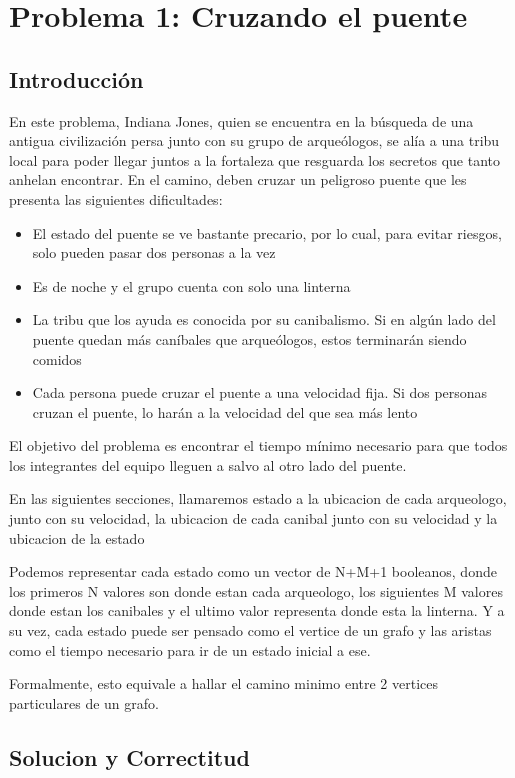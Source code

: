 \section{Problema 1: Cruzando el puente}

\subsection{Introducción}
	En este problema, Indiana Jones, quien se encuentra en la búsqueda de una antigua civilización persa junto con su grupo de arqueólogos, se alía a una tribu local para poder llegar juntos a la fortaleza que resguarda los secretos que tanto anhelan encontrar. En el camino, deben cruzar un peligroso puente que les presenta las siguientes dificultades:
	\begin{itemize}
	\item El estado del puente se ve bastante precario, por lo cual, para evitar riesgos, solo pueden pasar dos personas a la vez
	\item Es de noche y el grupo cuenta con solo una linterna
	\item La tribu que los ayuda es conocida por su canibalismo. Si en algún lado del puente quedan más caníbales que arqueólogos, estos terminarán siendo comidos
	\item Cada persona puede cruzar el puente a una velocidad fija. Si dos personas cruzan el puente, lo harán a la velocidad del que sea más lento
	\end{itemize}
	El objetivo del problema es encontrar el tiempo mínimo necesario para que todos los integrantes del equipo lleguen a salvo al otro lado del puente.

	En las siguientes secciones, llamaremos estado a la ubicacion de cada arqueologo, junto con su velocidad, la ubicacion de cada canibal junto con su velocidad y la ubicacion de la estado

	Podemos representar cada estado como un vector de N+M+1 booleanos, donde los primeros N valores son donde estan cada arqueologo, los siguientes M valores donde estan los canibales y el ultimo valor representa donde esta la linterna. Y a su vez, cada estado puede ser pensado como el vertice de un grafo y las aristas como el tiempo necesario para ir de un estado inicial a ese.

	Formalmente, esto equivale a hallar el camino minimo entre 2 vertices particulares de un grafo.

\subsection{Solucion y Correctitud}

